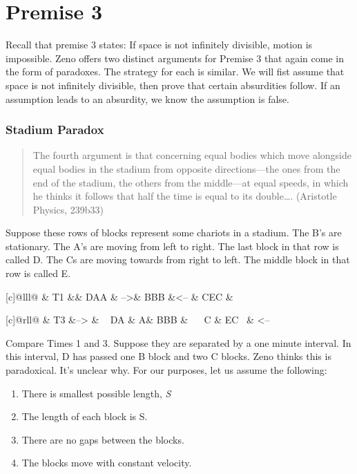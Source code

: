 \documentclass[]{article}
\begin{document}
\section{Premise 3}\label{premise-3}

Recall that premise 3 states:   If space is not infinitely divisible, motion is impossible. Zeno offers two distinct arguments for Premise
3 that again come in the form of paradoxes. The strategy for each is
similar. We will fist assume that space is not infinitely divisible,
then prove that certain absurdities follow. If an assumption leads to an
absurdity, we know the assumption is false.

\subsubsection{Stadium Paradox}\label{stadium-paradox}

\begin{quote}
The fourth argument is that concerning equal bodies which move alongside
equal bodies in the stadium from opposite directions---the ones from the
end of the stadium, the others from the middle---at equal speeds, in
which he thinks it follows that half the time is equal to its
double\ldots{}. (Aristotle Physics, 239b33)
\end{quote}

Suppose these rows of blocks represent some chariots in a stadium. The
B's are stationary. The A's are moving from left to right. The last
block in that row is called D. The Cs are moving towards from right to
left. The middle block in that row is called E.

{[}c{]}{@lll@} \& T1 \&\& DAA \& --\textgreater{}\& BBB \&\textless{}--
\& CEC \&

{[}c{]}{@rll@} \& T3 \&--\textgreater{} \& ~ DA \& A\& BBB \&~ ~ C \&
EC~ \& \textless{}--

Compare Times 1 and 3. Suppose they are separated by a one minute
interval. In this interval, D has passed one B block and two C blocks.
Zeno thinks this is paradoxical. It's unclear why. For our purposes, let
us assume the following:

\begin{enumerate}
\def\labelenumi{\arabic{enumi}.}
\item
  There is smallest possible length, \emph{S}
\item
  The length of each block is S.
\item
  There are no gaps between the blocks.
\item
  The blocks move with constant velocity.
\end{enumerate}
\end{document}
